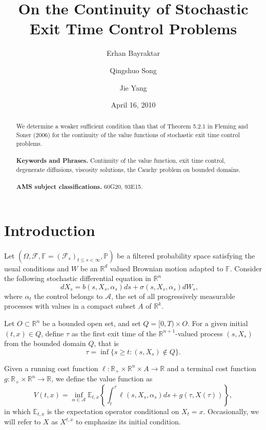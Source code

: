 \documentclass[11pt,reqno]{amsart}
\title[]{On the Continuity of Stochastic Exit Time Control Problems}
\author[]{Erhan Bayraktar}
\author[]{Qingshuo Song}
\author[]{Jie Yang}
\numberwithin{equation}{section}
\renewcommand{\P}{\mathbb{P}}
\newcommand{\R}{\mathbb{R}}
\begin{document}
\date{April 16, 2010}

\maketitle

\begin{abstract}

We determine a weaker sufficient condition than that of Theorem 5.2.1
in Fleming and Soner (2006) for the continuity of the value functions
of stochastic exit time control problems.
\\ \\  {\bf Keywords and Phrases.}
Continuity of the value function, exit time control, degenerate diffusions,
viscosity solutions, the Cauchy problem on bounded domains.
\\ \\
{\bf AMS subject classifications.} 60G20, 93E15.  
\end{abstract}


\section{Introduction}

Let $(\Omega, \mathcal{F}, \mathbb{F}=(\mathcal{F}_s)_{t\le s<\infty}, \P)$ be a filtered probability space
satisfying 
the usual conditions and $W$ be an $\mathbb{R}^{d}$ valued Brownian motion adapted to $\mathbb{F}$. Consider the following stochastic differential equation in $\R^n$
\begin{equation}
  \label{eq:sde}
  d X_s = b(s, X_s, \alpha_s) ds + \sigma (s, X_s, \alpha_s) dW_s, \quad
\end{equation}
where $\alpha_t$ the control belongs to $\mathcal{A}$, the set of all progressively measurable processes with values in a compact subset $A$ of $\mathbb{R}^k$.

Let $O\subset \mathbb{R}^n$ be a
bounded open set, and set $Q = [0,T)\times O$. For a given initial
$(t,x) \in Q$, define $\tau$ as the
first exit time of the $\mathbb{R}^{n+1}$-valued process $(s,X_s)$ from
the bounded domain $Q$, that is
\begin{equation}\label{eq:tau}
  \tau = \inf\{s\ge t: (s,X_s) \notin Q\}.
\end{equation}

Given a running cost function $\ell:
\mathbb{R}_{+} \times \mathbb{R}^n \times A \to \mathbb{R}$ and a terminal
cost function $g: \mathbb{R}_{+} \times \mathbb{R}^n \to \mathbb{R}$,
we define the value function as
\begin{equation}\label{eq:valp}
  V(t,x) = \inf_{\alpha \in \mathcal{A}} \mathbb{E}_{t,x}\left\{\int_t^\tau \ell(s, X_s,
  \alpha_s) ds + g(\tau, X(\tau))\right\},
\end{equation}
in which $\mathbb{E}_{t,x}$ is the expectation operator conditional on
$X_t=x$. Occasionally, we will refer to $X$ as $X^{t,x}$ to emphasize
its initial condition.  
\end{document}
